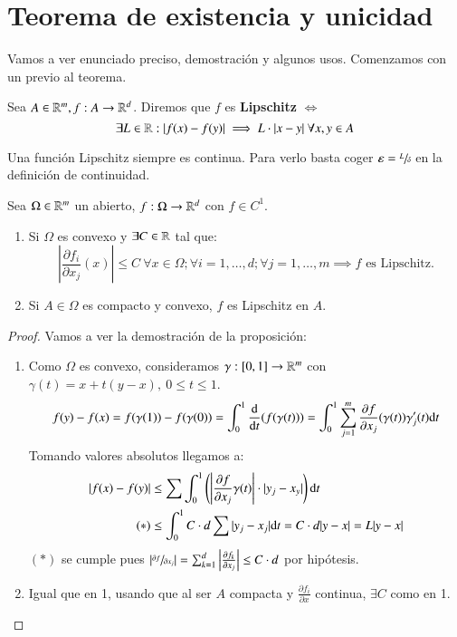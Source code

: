 \section{Teorema de existencia y unicidad}
Vamos a ver enunciado preciso, demostración y algunos usos. Comenzamos con un previo al teorema.\\
\begin{dfn}
    Sea $A \in \mathbb{R}^m, f: A \to \mathbb{R}^d$. Diremos que $f$ es \textbf{Lipschitz} $\iff$
    $$
        \exists L \in \mathbb{R} : |f(x) - f(y)| \implies L \cdot |x - y|\ \forall x,y \in A
    $$
\end{dfn}
\begin{obs}
    Una función Lipschitz siempre es continua. Para verlo basta coger $\varepsilon = \sfrac{L}{\delta}$ en la definición de continuidad.
\end{obs}
\begin{pro}
    Sea $\Omega \in \mathbb{R}^m$ un abierto, $f:\Omega \to \mathbb{R}^d$ con $f \in C^1$.
    \begin{enumerate}
        \item Si $\Omega$ es convexo y $\exists C \in \mathbb{R}$ tal que:
        $$
            \left| \frac{\partial f_i}{\partial x_j} (x) \right| \leq C\ \forall x\in \Omega; \forall i = 1, \ldots, d; \forall j = 1, \ldots, m \implies f \text{ es Lipschitz.}
        $$
        \item Si $A \in \Omega$ es compacto y convexo, $f$ es Lipschitz en $A$.
    \end{enumerate}
\end{pro}
\begin{proof}
    Vamos a ver la demostración de la proposición:
    \begin{enumerate}
        \item
    Como $\Omega$ es convexo, consideramos $\gamma: [0,1] \to \mathbb{R}^m$ con $\gamma(t) = x + t(y-x),\ 0\leq t\leq 1$.
    $$
        f(y) - f(x) = f(\gamma(1)) - f(\gamma(0)) = \int_0^1 \frac{\mathrm{d}}{\mathrm{d}t} (f(\gamma(t))) = \int_0^1 \sum_{j=1}^m \frac{\partial f}{\partial x_j}(\gamma(t)) \gamma_j'(t) \mathrm{d} t
    $$
    Tomando valores absolutos llegamos a:
    \begin{align*}
        |f(x) - f(y)| &\leq \sum \int_0^1 \left(\left| \frac{\partial f}{\partial x_j} \gamma(t) \right| \cdot |y_j - x_y|\right) \mathrm{d} t\\
                     (*) & \leq \int_0^1 C\cdot d \sum |y_j - x_j| \mathrm{d} t =  C\cdot d |y -x| = L |y-x|
    \end{align*}
    $(*)$ se cumple pues $\left|\sfrac{\partial f}{\partial x_j}\right| = \sum_{k=1}^d \left| \frac{\partial f_k}{\partial x_j} \right| \leq C\cdot d$ por hipótesis.
    \item Igual que en 1, usando que al ser $A$ compacta y $\frac{\partial f_i}{\partial x}$ continua, $\exists C$ como en 1.
\end{enumerate}
\end{proof}
